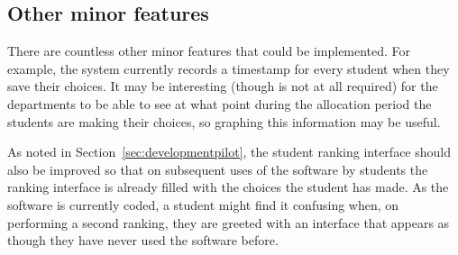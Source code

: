\subsection{Other minor features}

There are countless other minor features that could be implemented. For
example, the system currently records a timestamp for every student when they
save their choices. It may be interesting (though is not at all required) for
the departments to be able to see at what point during the allocation period
the students are making their choices, so graphing this information may be
useful.

As noted in Section~\ref{sec:developmentpilot}, the student ranking interface
should also be improved so that on subsequent uses of the software by students
the ranking interface is already filled with the choices the student has made.
As the software is currently coded, a student might find it confusing when, on
performing a second ranking, they are greeted with an interface that appears
as though they have never used the software before.
